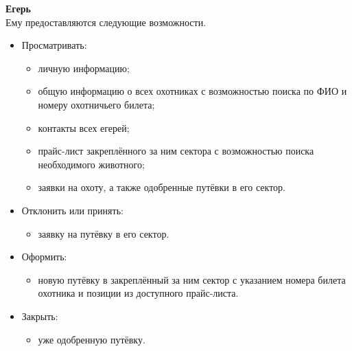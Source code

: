 		\textbf{Егерь} \\
		Ему предоставляются следующие возможности.
		\begin{itemize}
			\item Просматривать:
			\begin{itemize}
				\item личную информацию;
				\item общую информацию о всех охотниках с возможностью поиска по ФИО и номеру охотничьего билета;
				\item контакты всех егерей;
				\item прайс-лист закреплённого за ним сектора с возможностью поиска необходимого животного;
				\item заявки на охоту, а также одобренные путёвки в его сектор.
			\end{itemize}
			\item Отклонить или принять:
			\begin{itemize} 
				\item заявку на путёвку в его сектор.
			\end{itemize}
			\item Оформить:
			\begin{itemize} 
				\item новую путёвку в закреплённый за ним сектор с указанием номера билета охотника и позиции из доступного прайс-листа.
			\end{itemize}
			\item Закрыть:
			\begin{itemize}
				\item уже одобренную путёвку.
			\end{itemize}
			
		\end{itemize}
		
